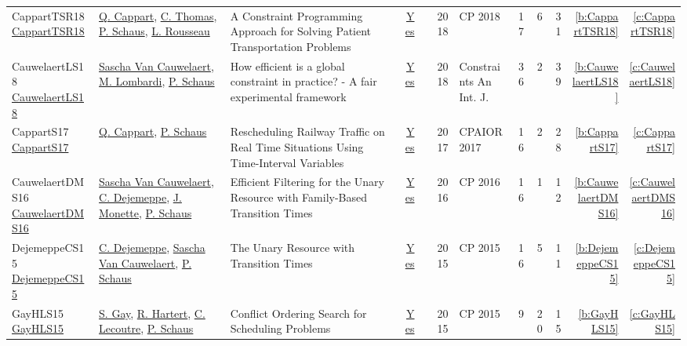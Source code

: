 {\begin{longtable}{>{\raggedright\arraybackslash}p{3cm}>{\raggedright\arraybackslash}p{6cm}>{\raggedright\arraybackslash}p{6.5cm}rrrp{2.5cm}rrrrr}
CappartTSR18 \href{https://doi.org/10.1007/978-3-319-98334-9\_32}{CappartTSR18} & \hyperref[auth:a42]{Q. Cappart}, \hyperref[auth:a847]{C. Thomas}, \hyperref[auth:a148]{P. Schaus}, \hyperref[auth:a332]{L. Rousseau} & A Constraint Programming Approach for Solving Patient Transportation Problems & \href{../works/CappartTSR18.pdf}{Yes} & \cite{CappartTSR18} & 2018 & CP 2018 & 17 & 6 & 31 & \ref{b:CappartTSR18} & \ref{c:CappartTSR18}\\
CauwelaertLS18 \href{https://doi.org/10.1007/s10601-017-9277-y}{CauwelaertLS18} & \hyperref[auth:a207]{Sascha Van Cauwelaert}, \hyperref[auth:a143]{M. Lombardi}, \hyperref[auth:a148]{P. Schaus} & How efficient is a global constraint in practice? - {A} fair experimental framework & \href{../works/CauwelaertLS18.pdf}{Yes} & \cite{CauwelaertLS18} & 2018 & Constraints An Int. J. & 36 & 2 & 39 & \ref{b:CauwelaertLS18} & \ref{c:CauwelaertLS18}\\
CappartS17 \href{https://doi.org/10.1007/978-3-319-59776-8\_26}{CappartS17} & \hyperref[auth:a42]{Q. Cappart}, \hyperref[auth:a148]{P. Schaus} & Rescheduling Railway Traffic on Real Time Situations Using Time-Interval Variables & \href{../works/CappartS17.pdf}{Yes} & \cite{CappartS17} & 2017 & CPAIOR 2017 & 16 & 2 & 28 & \ref{b:CappartS17} & \ref{c:CappartS17}\\
CauwelaertDMS16 \href{https://doi.org/10.1007/978-3-319-44953-1\_33}{CauwelaertDMS16} & \hyperref[auth:a207]{Sascha Van Cauwelaert}, \hyperref[auth:a208]{C. Dejemeppe}, \hyperref[auth:a150]{J. Monette}, \hyperref[auth:a148]{P. Schaus} & Efficient Filtering for the Unary Resource with Family-Based Transition Times & \href{../works/CauwelaertDMS16.pdf}{Yes} & \cite{CauwelaertDMS16} & 2016 & CP 2016 & 16 & 1 & 12 & \ref{b:CauwelaertDMS16} & \ref{c:CauwelaertDMS16}\\
DejemeppeCS15 \href{https://doi.org/10.1007/978-3-319-23219-5\_7}{DejemeppeCS15} & \hyperref[auth:a208]{C. Dejemeppe}, \hyperref[auth:a207]{Sascha Van Cauwelaert}, \hyperref[auth:a148]{P. Schaus} & The Unary Resource with Transition Times & \href{../works/DejemeppeCS15.pdf}{Yes} & \cite{DejemeppeCS15} & 2015 & CP 2015 & 16 & 5 & 11 & \ref{b:DejemeppeCS15} & \ref{c:DejemeppeCS15}\\
GayHLS15 \href{https://doi.org/10.1007/978-3-319-23219-5\_10}{GayHLS15} & \hyperref[auth:a217]{S. Gay}, \hyperref[auth:a218]{R. Hartert}, \hyperref[auth:a219]{C. Lecoutre}, \hyperref[auth:a148]{P. Schaus} & Conflict Ordering Search for Scheduling Problems & \href{../works/GayHLS15.pdf}{Yes} & \cite{GayHLS15} & 2015 & CP 2015 & 9 & 20 & 15 & \ref{b:GayHLS15} & \ref{c:GayHLS15}\\

\end{longtable}}
